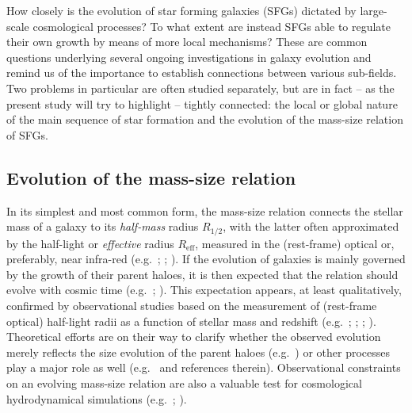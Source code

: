 \documentclass[fleqn,usenatbib]{mnras}
\begin{document}
How closely is the evolution of star forming galaxies (SFGs) dictated by large-scale cosmological processes? To what extent are instead SFGs able to regulate their own growth by means of more local mechanisms? These are common questions underlying several ongoing investigations in galaxy evolution and remind us of the importance to establish connections between various sub-fields. Two problems in particular are often studied separately, but are in fact -- as the present study will try to highlight -- tightly connected: the local or global nature of the main sequence of star formation and the evolution of the mass-size relation of SFGs.

\subsection{Evolution of the mass-size relation}\label{subsec:intro_masssize}

In its simplest and most common form, the mass-size relation connects the stellar mass of a galaxy to its \emph{half-mass} radius $R_{1/2}$, with the latter often approximated by the half-light or \emph{effective} radius $R_\textrm{eff}$, measured in the (rest-frame) optical or, preferably, near infra-red (e.g.\ \citealt{Lange+15}; \citealt{Lelli+16}; \citealt{Wu+18}). If the evolution of galaxies is mainly governed by the growth of their parent haloes, it is then expected that the relation should evolve with cosmic time (e.g.\ \citealt{MMW98}; \citealt{Dutton+11}). This expectation appears, at least qualitatively, confirmed by observational studies based on the measurement of (rest-frame optical) half-light radii as a function of stellar mass and redshift (e.g.\ \citealt{vdW+14}; \citealt{Paulino-Afonso+17}; \citealt{Mowla+19}; \citealt{Nedkova+21}). Theoretical efforts are on their way to clarify whether the observed evolution merely reflects the size evolution of the parent haloes (e.g.\ \citealt{Huang+17}) or other processes play a major role as well (e.g.\ \citealt{Somerville+18} and references therein). Observational constraints on an evolving mass-size relation are also a valuable test for cosmological hydrodynamical simulations (e.g.\ \citealt{Furlong+17}; \citealt{Genel+18}).
\end{document}
